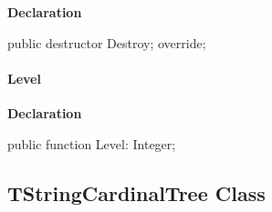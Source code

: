 \documentclass{report}
\newif\ifpdf
\begin{document}
\label{PasDoc_HierarchyTree.TPasItemNode-Destroy}
\begin{list}{}{
\setlength{\itemindent}{0cm}
\setlength{\listparindent}{0cm}
\setlength{\leftmargin}{\evensidemargin}
\addtolength{\leftmargin}{\tmplength}
\settowidth{\labelsep}{X}
\addtolength{\leftmargin}{\labelsep}
\setlength{\labelwidth}{\tmplength}
}
\item[\textbf{Declaration}\hfill]
\ifpdf
\begin{flushleft}
\fi
\begin{ttfamily}
public destructor Destroy; override;\end{ttfamily}

\ifpdf
\end{flushleft}
\fi

\end{list}
\paragraph*{Level}\hspace*{\fill}

\label{PasDoc_HierarchyTree.TPasItemNode-Level}
\begin{list}{}{
\setlength{\itemindent}{0cm}
\setlength{\listparindent}{0cm}
\setlength{\leftmargin}{\evensidemargin}
\addtolength{\leftmargin}{\tmplength}
\settowidth{\labelsep}{X}
\addtolength{\leftmargin}{\labelsep}
\setlength{\labelwidth}{\tmplength}
}
\item[\textbf{Declaration}\hfill]
\ifpdf
\begin{flushleft}
\fi
\begin{ttfamily}
public function Level: Integer;\end{ttfamily}

\ifpdf
\end{flushleft}
\fi

\end{list}
\ifpdf
\subsection*{\large{\textbf{TStringCardinalTree Class}}\normalsize\hspace{1ex}\hrulefill}
\else
\subsection*{TStringCardinalTree Class}
\fi
\label{PasDoc_HierarchyTree.TStringCardinalTree}
\end{document}
